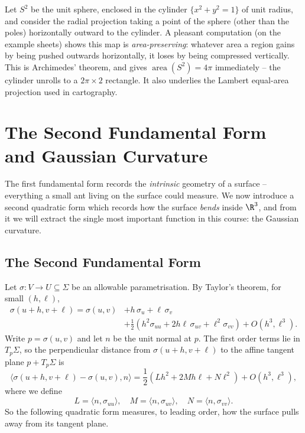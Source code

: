 \begin{example}[Archimedes]
    Let $S^2$ be the unit sphere, enclosed in the cylinder $\{x^2 + y^2 = 1\}$ of unit radius, and consider the radial projection taking a point of the sphere (other than the poles) horizontally outward to the cylinder. A pleasant computation (on the example sheets) shows this map is \emph{area-preserving}: whatever area a region gains by being pushed outwards horizontally, it loses by being compressed vertically. This is Archimedes' theorem, and gives $\operatorname{area}(S^2) = 4\pi$ immediately -- the cylinder unrolls to a $2\pi \times 2$ rectangle. It also underlies the Lambert equal-area projection used in cartography.
\end{example}

\section{The Second Fundamental Form and Gaussian Curvature}

The first fundamental form records the \emph{intrinsic} geometry of a surface -- everything a small ant living on the surface could measure. We now introduce a second quadratic form which records how the surface \emph{bends} inside $\R^3$, and from it we will extract the single most important function in this course: the Gaussian curvature.

\subsection{The Second Fundamental Form}

Let $\sigma: V \rightarrow U \subseteq \Sigma$ be an allowable parametrisation. By Taylor's theorem, for small $(h, \ell)$,
\begin{align*}
    \sigma(u + h, v + \ell) = \sigma(u, v) &+ h\, \sigma_u + \ell \, \sigma_v \\
    &+ \frac{1}{2}\left(h^2 \sigma_{uu} + 2 h \ell \, \sigma_{uv} + \ell^2 \sigma_{vv}\right) + O(h^3, \ell^3).
\end{align*}
Write $p = \sigma(u,v)$ and let $n$ be the unit normal at $p$. The first order terms lie in $T_p\Sigma$, so the perpendicular distance from $\sigma(u + h, v+\ell)$ to the affine tangent plane $p + T_p\Sigma$ is
$$
\langle \sigma(u+h, v+\ell) - \sigma(u,v), n \rangle = \frac{1}{2}\left(L h^2 + 2M h\ell + N \ell^2\right) + O(h^3, \ell^3),
$$
where we define
$$
L = \langle n, \sigma_{uu}\rangle, \quad M = \langle n, \sigma_{uv} \rangle, \quad N = \langle n, \sigma_{vv} \rangle.
$$
So the following quadratic form measures, to leading order, how the surface pulls away from its tangent plane.

